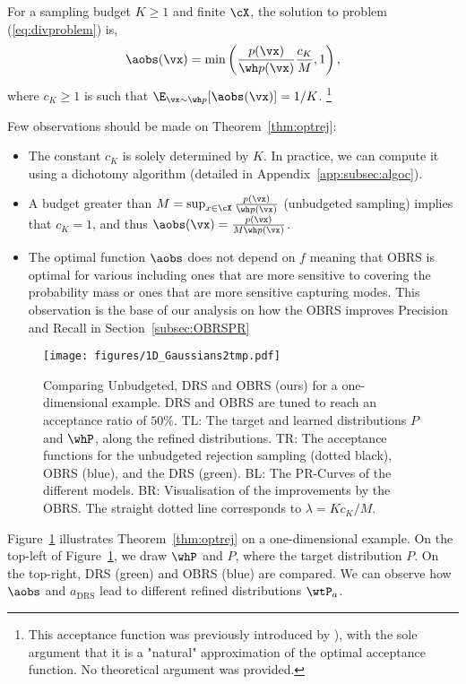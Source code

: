 \documentclass[twoside]{article}
\begin{document}
\begin{theorem}\label{thm:optrej}
For a sampling budget $K\geq 1$ and finite $\cX$, the solution to problem (\ref{eq:divproblem}) is,
\begin{align}
		\aobs(\vx)  = \min\left(\frac{p(\vx)}{\wh p(\vx)}\frac{c_K}{M}, 1\right),
	\end{align}
where $c_K\ge  1$ is such that $\E_{\vx\sim \wh p}[\aobs(\vx)] =1/K$.
\footnote{This acceptance function was previously introduced by \cite{grover_variational_2018}), with the sole argument that it is a "natural" approximation of the optimal acceptance function. No theoretical argument was provided.} 
\end{theorem}
Few observations should be made on Theorem~\ref{thm:optrej}:
\begin{itemize}
    \item The constant $c_K$ is solely determined by $K$. In practice, we can compute it using a dichotomy algorithm (detailed in Appendix~\ref{app:subsec:algoc}).
    \item A budget greater than $M = \sup_{x\in \cX}\frac{p(\vx)}{\wh p(\vx)}$ (unbudgeted sampling) implies that $c_K=1$, and thus $\aobs(\vx)  = \frac{p(\vx)}{M\wh p(\vx)}$. 
    \item The optimal function $\aobs$ does not depend on $f$ meaning that OBRS is optimal for various  \fdivs including ones that are more sensitive to covering the probability mass or ones that are more sensitive capturing modes. This observation is the base of our analysis on how the OBRS improves Precision and Recall in Section~\ref{subsec:OBRSPR}
\end{itemize}

\begin{figure}[t!]
    \centering
    \texttt{[image: figures/1D\_Gaussians2tmp.pdf]}
    \caption{Comparing Unbudgeted, DRS \citep{azadi_discriminator_2019} and OBRS (ours) for a one-dimensional example. DRS and OBRS are tuned to reach an acceptance ratio of $50\%$. TL: The target and learned distributions $P$ and $\whP$, along the refined distributions. TR: The acceptance functions for the unbudgeted rejection sampling (dotted black), OBRS (blue), and the DRS (green). BL: The PR-Curves of the different models. BR: Visualisation of the improvements by the OBRS. The straight dotted line corresponds to $\lambda=Kc_K/M$.
    }
    \label{fig:1D}
\end{figure}


Figure~\ref{fig:1D} illustrates Theorem~\ref{thm:optrej} on a one-dimensional example. On the top-left of Figure~\ref{fig:1D}, we draw $\whP$ and $P$, where the target distribution $P$. On the top-right, DRS (green) and OBRS (blue) are compared.  We can observe how $\aobs$ and $a_{\mathrm{DRS}}$ lead to different refined distributions $\wtP_a$.
\end{document}
